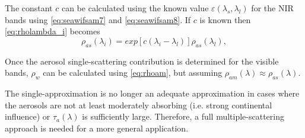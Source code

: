 The constant $c$ can be calculated using the known value $\varepsilon(\lambda_s,\lambda_l)$ for the NIR bands using \autoref{eq:seawifsam7} and \autoref{eq:seawifsam8}. If $c$ is known then \autoref{eq:rholambda_i} becomes
\begin{equation}\label{eq:rholambda_ifinal}
  \rho_{as}(\lambda_i) = exp[c(\lambda_i-\lambda_l)]\rho_{as}(\lambda_l),
\end{equation}

Once the aerosol single-scattering contribution is determined for the visible bands, $\rho_w$ can be calculated using \autoref{eq:rhoam}, but assuming $\rho_{am}(\lambda)\approx\rho_{as}(\lambda)$. 

The single-approximation is no longer an adequate approximation in cases where the aerosols are not at least moderately absorbing (i.e. strong continental influence) or $\tau_a(\lambda)$ is sufficiently large. Therefore, a full multiple-scattering approach is needed for a more general application.



